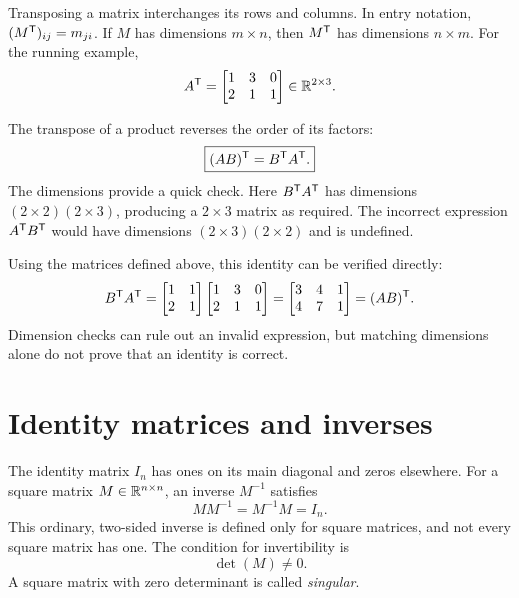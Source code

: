 Transposing a matrix interchanges its rows and columns. In entry notation,
$(M^{\mathsf T})_{ij}=m_{ji}$. If $M$ has dimensions $m\times n$, then $M^{\mathsf T}$
has dimensions $n\times m$. For the running example,
\begin{equation}
 A^{\mathsf T}=\begin{bmatrix}1&3&0\\2&1&1\end{bmatrix}\in\mathbb{R}^{2\times3}.
\end{equation}

The transpose of a product reverses the order of its factors:
\begin{equation}
 \boxed{(AB)^{\mathsf T}=B^{\mathsf T} A^{\mathsf T}.}
 \label{eq:l01-transpose-product}
\end{equation}
The dimensions provide a quick check. Here $B^{\mathsf T} A^{\mathsf T}$ has dimensions
$(2\times2)(2\times3)$, producing a $2\times3$ matrix as required. The
incorrect expression $A^{\mathsf T} B^{\mathsf T}$ would have dimensions
$(2\times3)(2\times2)$ and is undefined.

Using the matrices defined above, this identity can be verified directly:
\[
 B^{\mathsf T} A^{\mathsf T}
 =\begin{bmatrix}1&1\\2&1\end{bmatrix}
  \begin{bmatrix}1&3&0\\2&1&1\end{bmatrix}
 =\begin{bmatrix}3&4&1\\4&7&1\end{bmatrix}
 =(AB)^{\mathsf T}.
\]
Dimension checks can rule out an invalid expression, but matching dimensions
alone do not prove that an identity is correct.

\section{Identity matrices and inverses}

The identity matrix $I_n$ has ones on its main diagonal and zeros elsewhere.
For a square matrix $M\in\mathbb{R}^{n\times n}$, an inverse $M^{-1}$ satisfies
\begin{equation}
 MM^{-1}=M^{-1}M=I_n.
\end{equation}
This ordinary, two-sided inverse is defined only for square matrices, and not
every square matrix has one. The condition for invertibility is
\begin{equation}
 \boxed{\det(M)\ne0.}
\end{equation}
A square matrix with zero determinant is called \emph{singular}.

